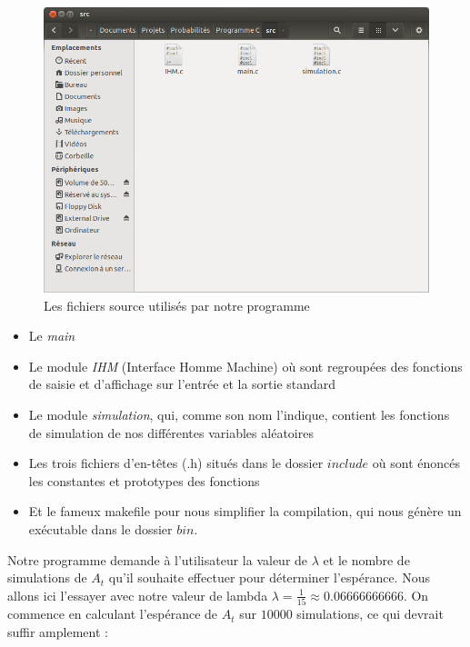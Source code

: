 \documentclass[a4paper, titlepage]{livret} %
\begin{document}
				\begin{figure}[!ht]
					\centering
  						\includegraphics[scale = 0.38]{captureFichiers.png}
  						\caption{Les fichiers source utilisés par notre programme}
				\end{figure}

				\begin{itemize}
					\item Le \textit{main}
					\item Le module \textit{IHM} (Interface Homme Machine) où sont regroupées des fonctions de saisie et d'affichage sur l'entrée et la sortie standard
					\item Le module \textit{simulation}, qui, comme son nom l'indique, contient les fonctions de simulation de nos différentes variables aléatoires
					\item Les trois fichiers d'en-têtes (.h) situés dans le dossier $include$ où sont énoncés les constantes et prototypes des fonctions
					\item Et le fameux makefile pour nous simplifier la compilation, qui nous génère un exécutable dans le dossier $bin$.
				\end{itemize}

				Notre programme demande à l'utilisateur la valeur de $\lambda$ et le nombre de simulations de $A_{t}$ qu'il souhaite effectuer pour déterminer l'espérance.
				Nous allons ici l'essayer avec notre valeur de lambda $\lambda = \frac{1}{15} \approx 0.06666666666$.
				On commence en calculant l'espérance de $A_{t}$ sur $10 000$ simulations, ce qui devrait suffir amplement :
\end{document}

